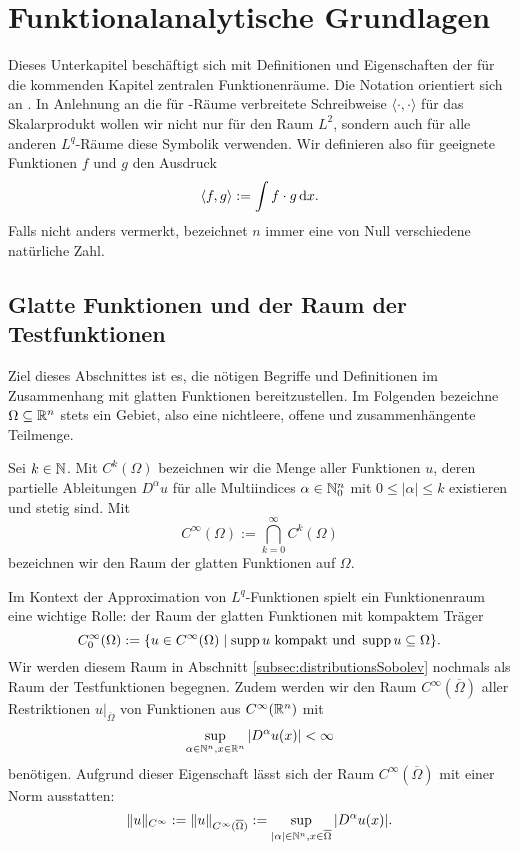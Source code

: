 \chapter{Funktionalanalytische Grundlagen}
\label{cp:grundlagen}

Dieses Unterkapitel beschäftigt sich mit Definitionen und Eigenschaften der für die kommenden Kapitel zentralen Funktionenräume.
Die Notation orientiert sich an \cite{sohr2001navier}.
In Anlehnung an die für \hilbert\hyp{}Räume verbreitete Schreibweise $\langle \cdot, \cdot \rangle$ für das Skalarprodukt wollen wir nicht nur für den Raum $L^2$, sondern auch für alle anderen $L^q$\hyp{}Räume diese Symbolik verwenden.
Wir definieren also für geeignete Funktionen $f$ und $g$ den Ausdruck
$$
\langle f, g \rangle := \int f \cdot g \, {\operatorname{d}\!{x}}.
$$
Falls nicht anders vermerkt, bezeichnet $n$ immer eine von Null verschiedene natürliche Zahl.

\section{Glatte Funktionen und der Raum der Testfunktionen}
\label{subsec:smooth}

Ziel dieses Abschnittes ist es, die nötigen Begriffe und Definitionen im Zusammenhang mit glatten Funktionen bereitzustellen.
Im Folgenden bezeichne $\Omega \subseteq \mathbb{R}^n$ stets ein Gebiet, also eine nichtleere, offene und zusammenhängente Teilmenge.

Sei $k \in \mathbb{N}$. Mit $C^k(\Omega)$ bezeichnen wir die Menge aller Funktionen $u$, deren partielle Ableitungen $D^\alpha u$ für alle Multiindices $\alpha \in \mathbb{N}_0^n$ mit $0 \leq |\alpha| \leq k$ existieren und stetig sind. 
Mit
$$
  C^\infty(\Omega) := \bigcap_{k = 0}^\infty C^k(\Omega)
$$
bezeichnen wir den Raum der glatten Funktionen auf $\Omega$.

Im Kontext der Approximation von $L^q$-Funktionen spielt ein Funktionenraum eine wichtige Rolle: der Raum der glatten Funktionen mit kompaktem Träger
$$
C_0^\infty(\Omega) := \{ u \in C^\infty(\Omega) \mid \operatorname{supp} u \text{ kompakt und } \operatorname{supp} u \subseteq \Omega\}.
$$
Wir werden diesem Raum in Abschnitt \ref{subsec:distributionsSobolev} nochmals als Raum der Testfunktionen begegnen.
Zudem werden wir den Raum $C^\infty(\overline\Omega)$ aller Restriktionen $u|_{\overline\Omega}$ von Funktionen aus $C^\infty(\mathbb{R}^n)$ mit
\begin{displaymath}
  \sup_{\alpha  \in \mathbb{N}^n, x \in \mathbb{R}^n} |D^\alpha u(x)| < \infty 
\end{displaymath}
benötigen.
Aufgrund dieser Eigenschaft lässt sich der Raum $C^\infty(\overline\Omega)$ mit einer Norm ausstatten:
\begin{equation}
  \label{eq:cInftyNorm}
  \lVert u \rVert_{C^\infty} := \lVert u \rVert_{C^\infty(\overline\Omega)} := \sup_{|\alpha| \in \mathbb{N}^n, x \in \overline\Omega} |D^\alpha u(x)|.
\end{equation}

